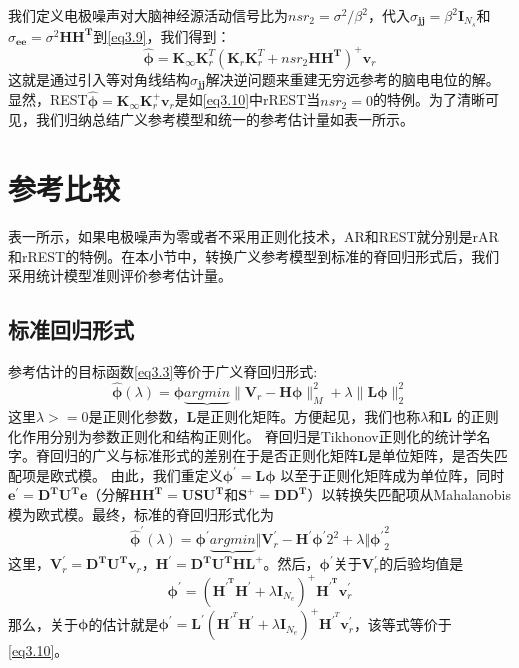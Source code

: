 我们定义电极噪声对大脑神经源活动信号比为$nsr_{2}=\sigma^{2}/\beta^{2}$，代入$\sigma_{\mathbf{jj}}=\beta^{2}\mathbf{I}_{N_{s}}$和$\sigma_{\mathbf{ee}}=\sigma^{2}\mathbf{HH^{T}}$到\eqref{eq3.9}，我们得到：
\begin{equation}\label{eq3.10}
\hat{\mathbf{\phi}}=\mathbf{K}_{\infty}\mathbf{K}_{r}^{T}(\mathbf{K}_{r}\mathbf{K}_{r}^{T}+nsr_{2}\mathbf{HH^{T}})^{+}\mathbf{v}_{r}
\end{equation}
这就是通过引入等对角线结构$\sigma_{\mathbf{jj}}$解决逆问题来重建无穷远参考的脑电电位的解。显然，REST$\hat{\mathbf{\phi}}=\mathbf{K}_{\infty}\mathbf{K}_{r}^{+}\mathbf{v}_{r}$是如\eqref{eq3.10}中rREST当$nsr_{2}=0$的特例。为了清晰可见，我们归纳总结广义参考模型和统一的参考估计量如表一所示。

\section{参考比较}
表一所示，如果电极噪声为零或者不采用正则化技术，AR和REST就分别是rAR和rREST的特例。在本小节中，转换广义参考模型到标准的脊回归形式后，我们采用统计模型准则评价参考估计量。
\subsection{标准回归形式}
参考估计的目标函数\eqref{eq3.3}等价于广义脊回归形式:
\begin{equation}\label{eq3.11}
\hat{\mathbf{\phi}}(\lambda)=\mathbf{\phi}\underbrace{argmin}{\lVert\mathbf{V}_{r}-\mathbf{H\phi}\rVert_{M}^{2}+\lambda\lVert\mathbf{L\phi}\rVert_2^2}
\end{equation}
这里$\lambda>=0$是正则化参数，$\mathbf{L}$是正则化矩阵。方便起见，我们也称$\lambda$和$\mathbf{L}$ 的正则化作用分别为参数正则化和结构正则化。
脊回归是Tikhonov正则化的统计学名字。脊回归的广义与标准形式的差别在于是否正则化矩阵$\mathbf{L}$是单位矩阵，是否失匹配项是欧式模。 由此，我们重定义$\mathbf{\phi^\prime=L\phi}$ 以至于正则化矩阵成为单位阵，同时$\mathbf{e^\prime=D^{T}U^{T}e}$（分解$\mathbf{HH^{T}=USU^{T}}$和$\mathbf{S}^{+}=\mathbf{DD^{T}}$）以转换失匹配项从Mahalanobis模为欧式模。最终，标准的脊回归形式化为
\begin{equation}\label{eq3.12}
\hat{\mathbf{\phi}}^\prime(\lambda)=\mathbf{\phi}^\prime\underbrace{argmin}{\Vert{\mathbf{V}_{r}^\prime-\mathbf{H^\prime\phi^\prime}}2^2+\lambda\Vert{\mathbf{\phi}^\prime}_2^2}
\end{equation}
这里，$\mathbf{V}^\prime_r=\mathbf{D^{T}U^{T}v}_{r}$，$\mathbf{H}^\prime=\mathbf{D^{T}U^{T}HL^{+}}$。然后，$\mathbf{\phi}^\prime$关于$\mathbf{V}^\prime_r$的后验均值是
\begin{equation}\label{eq3.13}
\mathbf{\phi}^\prime=(\mathbf{H^{\prime^T}}\mathbf{H}^\prime+\lambda\mathbf{I}_{N_e})^+\mathbf{H^{\prime^T}}\mathbf{v}^\prime_r
\end{equation}
那么，关于$\mathbf{\phi}$的估计就是$
\mathbf{\phi}^\prime=\mathbf{L}^\prime(\mathbf{H}^{\prime^T}\mathbf{H}^\prime+\lambda\mathbf{I}_{N_e})^+\mathbf{H}^{\prime^T}\mathbf{v}^\prime_r$，该等式等价于\eqref{eq3.10}。
